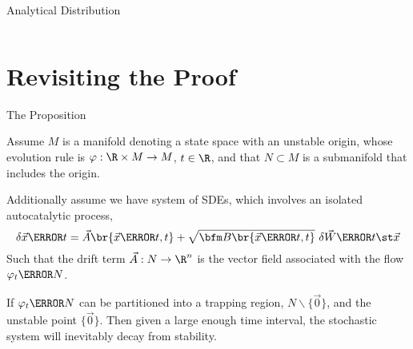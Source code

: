 \documentclass[aspectratio=169,  notheorems, sOuRcEs]{RUCPresentation}
\begin{document}
\begin{frame}{ Analytical Distribution }

    \begin{columns}

        \column{0.5\framewidth}

        \column{0.5\framewidth}

    \end{columns}


\end{frame}


\section{Revisiting the Proof}
\begin{frame}{The Proposition}

    \begin{proposition}[name={Stochastic Stability Decay}] \label{prp.ssd}

        Assume \(M\) is a manifold denoting a state space with an unstable origin,
        whose {evolution rule} is \(\varphi:\R\times M\to M\),
        \(t\in\R\), and that \(N\subset M\) is a submanifold that includes the origin.

        Additionally assume we have system of SDEs,
        which involves an isolated autocatalytic process,
        \begin{equation*}
            \delta \vec{x}\of t
            = \vec{A}\br{\vec{x}\of t, t}
            + \sqrt{\bfm B\br{\vec{x}\of t, t}} \ \delta{\vec{W}\of{t\st \vec{x}}}
        \end{equation*}
        Such that the drift term \(\vec{A}:N\to\R^n\) is the vector field
        associated with the flow \(\varphi_t\of N\).

        If \(\varphi_t\of{N}\) can be partitioned into a trapping region,
        \(N\backslash\{\vec{0}\}\), and the unstable point \(\{\vec{0}\}\).
        Then given a large enough time interval,
        the stochastic system will inevitably decay from stability.

    \end{proposition}

\end{frame}
\end{document}
